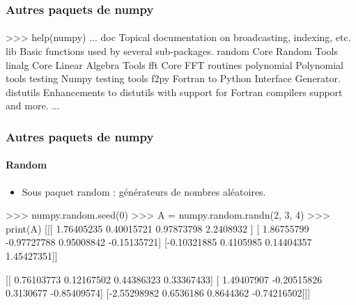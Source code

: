 \begin{frame}[fragile]
\frametitle{Autres paquets de numpy}
\framesubtitle{}
\begin{pythonConsole}
>>> help(numpy)
...
    doc
        Topical documentation on broadcasting, indexing, etc.
    lib
        Basic functions used by several sub-packages.
    random
        Core Random Tools
    linalg
        Core Linear Algebra Tools
    fft
        Core FFT routines
    polynomial
        Polynomial tools
    testing
        Numpy testing tools
    f2py
        Fortran to Python Interface Generator.
    distutils
        Enhancements to distutils with support for
        Fortran compilers support and more.
...
\end{pythonConsole}
\end{frame}
\begin{frame}[fragile]
\frametitle{Autres paquets de numpy}
\framesubtitle{Random}
\begin{itemize}
 \item Sous paquet random : générateurs de nombres aléatoires. 
\end{itemize}
\begin{pythonConsole}
>>> numpy.random.seed(0)
>>> A = numpy.random.randn(2, 3, 4)
>>> print(A)
[[[ 1.76405235  0.40015721  0.97873798  2.2408932 ]
  [ 1.86755799 -0.97727788  0.95008842 -0.15135721]
  [-0.10321885  0.4105985   0.14404357  1.45427351]]

 [[ 0.76103773  0.12167502  0.44386323  0.33367433]
  [ 1.49407907 -0.20515826  0.3130677  -0.85409574]
  [-2.55298982  0.6536186   0.8644362  -0.74216502]]]
\end{pythonConsole}
\end{frame}

